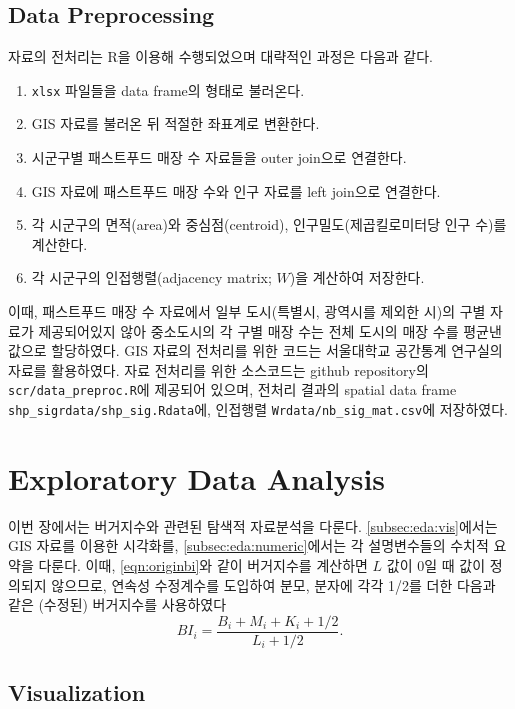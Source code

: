 \documentclass{scrartcl}
\begin{document}
\subsection{Data Preprocessing}\label{subsec:data:preproc}

자료의 전처리는 R을 이용해 수행되었으며 대략적인 과정은 다음과 같다. 
\begin{enumerate}
    \item \texttt{xlsx} 파일들을 data frame의 형태로 불러온다.
    \item GIS 자료를 불러온 뒤 적절한 좌표계로 변환한다.
    \item 시군구별 패스트푸드 매장 수 자료들을 outer join으로 연결한다.
    \item GIS 자료에 패스트푸드 매장 수와 인구 자료를 left join으로 연결한다. 
    \item 각 시군구의 면적(area)와 중심점(centroid), 인구밀도(제곱킬로미터당 인구 수)를 계산한다.
    \item 각 시군구의 인접행렬(adjacency matrix; $W$)을 계산하여 저장한다.
\end{enumerate}

이때, 패스트푸드 매장 수 자료에서 일부 도시(특별시, 광역시를 제외한 시)의 구별 자료가 제공되어있지 않아 중소도시의 각 구별 매장 수는 전체 도시의 매장 수를 평균낸 값으로 할당하였다. GIS 자료의 전처리를 위한 코드는 서울대학교 공간통계 연구실의 자료를 활용하였다. 자료 전처리를 위한 소스코드는 github repository의 \texttt{scr/data\_preproc.R}에 제공되어 있으며, 전처리 결과의 spatial data frame \texttt{shp\_sig}\는 \texttt{rdata/shp\_sig.Rdata}에, 인접행렬 \texttt{W}\는 \texttt{rdata/nb\_sig\_mat.csv}에 저장하였다.

\section{Exploratory Data Analysis}\label{sec:eda}

이번 장에서는 버거지수와 관련된 탐색적 자료분석을 다룬다. \autoref{subsec:eda:vis}에서는 GIS 자료를 이용한 시각화를, \autoref{subsec:eda:numeric}에서는 각 설명변수들의 수치적 요약을 다룬다. 이때, \autoref{eqn:originbi}와 같이 버거지수를 계산하면 $L$ 값이 0일 때 값이 정의되지 않으므로, 연속성 수정계수를 도입하여 분모, 분자에 각각 1/2를 더한 다음과 같은 (수정된) 버거지수를 사용하였다
\begin{equation}\label{eqn:bi}
    BI_i = \frac{B_i+M_i+K_i+1/2}{L_i+1/2}.
\end{equation}

\subsection{Visualization}\label{subsec:eda:vis}
\end{document}
